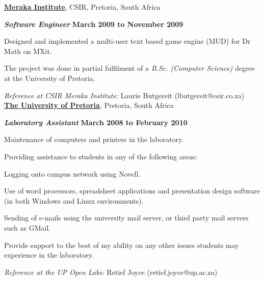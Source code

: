 \documentclass[10pt]{article}
\newenvironment{outerlist}[1][\enskip\textbullet]%
        {\begin{itemize}[#1]}{\end{itemize}%
         \vspace{-.6\baselineskip}}
\newenvironment{innerlist}[1][\enskip\textbullet]%
        {\begin{compactitem}[#1]}{\end{compactitem}}
\newenvironment{innerinnerlist}[1][\enskip$\circ$]%
        {\begin{compactitem}[#1]}{\end{compactitem}}
\begin{document}
\href{http://www.meraka.org.za}{\textbf{Meraka Institute}}, CSIR, Pretoria, South Africa
\begin{outerlist}
\item[] \textbf{\textit{Software Engineer}} \hfill \textbf{March 2009 to  November 2009}
        \begin{innerlist}
        \item Designed and implemented a multi-user text based game engine (MUD) for Dr Math on MXit.
        \item The project was done in partial fulfilment of a \textit{B.Sc. (Computer Science)} degree at the University of Pretoria.\\
        \end{innerlist}
\end{outerlist}
\textit{Reference at CSIR Meraka Institute:} \hfill Laurie Butgereit (lbutgereit@csir.co.za) \\


\href{http://www.up.ac.za}{\textbf{The University of Pretoria}}, Pretoria, South Africa
\begin{outerlist}
\item[] \textbf{\textit{Laboratory Assistant}} \hfill \textbf{March 2008 to  February 2010}
        \begin{innerlist}
        \item Maintenance of computers and printers in the laboratory.
        \item Providing assistance to students in any of the following areas:
        \begin{innerinnerlist}
        \item Logging onto campus network using Novell.
        \item Use of word processors, spreadsheet applications and presentation design software (in both Windows and Linux environments).
        \item Sending of e-mails using the university mail server, or third party mail servers such as GMail.
        \item Provide support to the best of my ability on any other issues students may experience in the laboratory. \\
        \end{innerinnerlist}
        \end{innerlist}
\end{outerlist}
\textit{Reference at the UP Open Labs:} \hfill Retief Joyce (retief.joyce@up.ac.za)
\end{document}
